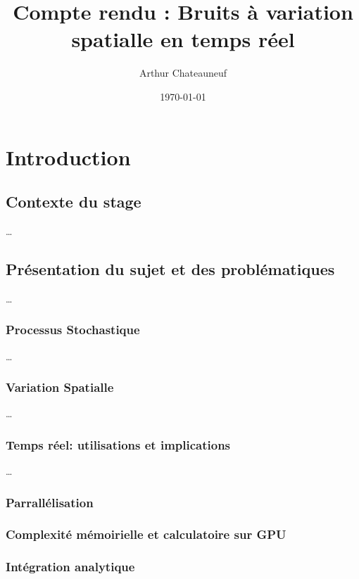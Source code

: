 \documentclass[9pt, twocolumn]{article} %
\title{Compte rendu : Bruits à variation spatialle en temps réel} %
\author{Arthur Chateauneuf} %
\date{\today} %
\begin{document}
\fontsize{9pt}{10pt}\selectfont
\maketitle %

\onecolumn
\tableofcontents
\twocolumn

\clearpage

\section{Introduction}

\subsection{Contexte du stage}
\ldots

\subsection{Présentation du sujet et des problématiques}
\ldots

\subsubsection{Processus Stochastique}
\ldots

\subsubsection{Variation Spatialle}
\ldots

\subsubsection{Temps réel: utilisations et implications}
\ldots

\subsubsection{Parrallélisation}
\subsubsection{Complexité mémoirielle et calculatoire sur GPU}
\subsubsection{Intégration analytique}
\end{document}
